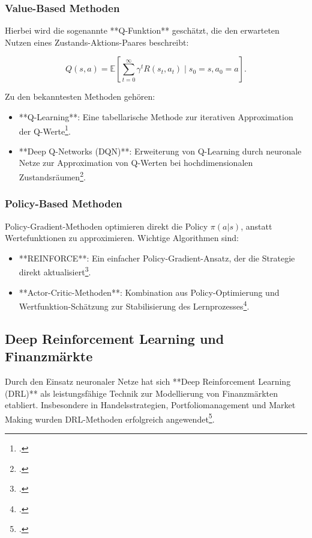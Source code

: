 \subsubsection{Value-Based Methoden}
Hierbei wird die sogenannte **Q-Funktion** geschätzt, die den erwarteten Nutzen eines Zustands-Aktions-Paares beschreibt:

\begin{equation}
	Q(s,a) = \mathbb{E} \left[ \sum_{t=0}^{\infty} \gamma^t R(s_t, a_t) \mid s_0 = s, a_0 = a \right].
\end{equation}

Zu den bekanntesten Methoden gehören:
\begin{itemize}
	\item **Q-Learning**: Eine tabellarische Methode zur iterativen Approximation der Q-Werte\footcite{Watkins1992}.
	\item **Deep Q-Networks (DQN)**: Erweiterung von Q-Learning durch neuronale Netze zur Approximation von Q-Werten bei hochdimensionalen Zustandsräumen\footcite{Mnih2015}.
\end{itemize}

\subsubsection{Policy-Based Methoden}
Policy-Gradient-Methoden optimieren direkt die Policy \( \pi(a|s) \), anstatt Wertefunktionen zu approximieren. Wichtige Algorithmen sind:

\begin{itemize}
	\item **REINFORCE**: Ein einfacher Policy-Gradient-Ansatz, der die Strategie direkt aktualisiert\footcite{Williams1992}.
	\item **Actor-Critic-Methoden**: Kombination aus Policy-Optimierung und Wertfunktion-Schätzung zur Stabilisierung des Lernprozesses\footcite{Sutton2000}.
\end{itemize}

\subsection{Deep Reinforcement Learning und Finanzmärkte}
Durch den Einsatz neuronaler Netze hat sich **Deep Reinforcement Learning (DRL)** als leistungsfähige Technik zur Modellierung von Finanzmärkten etabliert. Insbesondere in Handelsstrategien, Portfoliomanagement und Market Making wurden DRL-Methoden erfolgreich angewendet\footcite{Dixon2020, Zhang2023}.


